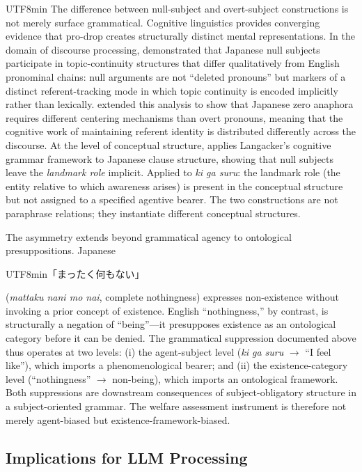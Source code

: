 \documentclass[12pt,a4paper]{article}
\begin{document}
\begin{CJK}{UTF8}{min}
The difference between null-subject and overt-subject constructions is not
merely surface grammatical. Cognitive linguistics provides converging evidence
that pro-drop creates structurally distinct mental representations. In the
domain of discourse processing, \citet{clancy1980} demonstrated that Japanese
null subjects participate in topic-continuity structures that differ
qualitatively from English pronominal chains: null arguments are not ``deleted
pronouns'' but markers of a distinct referent-tracking mode in which topic
continuity is encoded implicitly rather than lexically. \citet{kameyama1985}
extended this analysis to show that Japanese zero anaphora requires different
centering mechanisms than overt pronouns, meaning that the cognitive work of
maintaining referent identity is distributed differently across the discourse.
At the level of conceptual structure, \citet{kumashiro2003} applies
Langacker's cognitive grammar framework to Japanese clause structure, showing
that null subjects leave the \emph{landmark role} implicit. Applied to
\emph{ki ga suru}: the landmark role (the entity relative to which awareness
arises) is present in the conceptual structure but not assigned to a specified
agentive bearer. The two constructions are not paraphrase relations; they
instantiate different conceptual structures.

The asymmetry extends beyond grammatical agency to ontological presuppositions.
Japanese
\begin{CJK}{UTF8}{min}「まったく何もない」\end{CJK}
(\emph{mattaku nani mo nai}, complete nothingness) expresses non-existence
without invoking a prior concept of existence. English ``nothingness,'' by
contrast, is structurally a negation of ``being''---it presupposes existence
as an ontological category before it can be denied. The grammatical suppression
documented above thus operates at two levels: (i) the agent-subject level
(\emph{ki ga suru} $\rightarrow$ ``I feel like''), which imports a
phenomenological bearer; and (ii) the existence-category level (``nothingness''
$\rightarrow$ non-being), which imports an ontological framework. Both
suppressions are downstream consequences of subject-obligatory structure in a
subject-oriented grammar. The welfare assessment instrument is therefore not
merely agent-biased but existence-framework-biased.

\subsection{Implications for LLM Processing}


\end{CJK}
\end{document}
